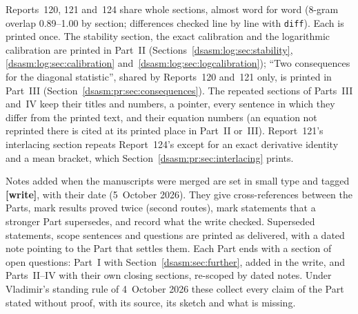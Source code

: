 \documentclass[11pt,letterpaper]{article}
\theoremstyle{remark}\newtheorem{remark}[theorem]{Remark}
\begin{document}
Reports~120, 121 and~124 share whole sections, almost word for word (8-gram overlap 0.89--1.00 by section; differences checked line by line with \texttt{diff}). Each is printed once. The stability section, the exact calibration and the logarithmic calibration are printed in Part~II (Sections~\ref{dsasm:log:sec:stability}, \ref{dsasm:log:sec:calibration} and~\ref{dsasm:log:sec:logcalibration}); ``Two consequences for the diagonal statistic'', shared by Reports~120 and~121 only, is printed in Part~III (Section~\ref{dsasm:pr:sec:consequences}). The repeated sections of Parts~III and~IV keep their titles and numbers, a pointer, every sentence in which they differ from the printed text, and their equation numbers (an equation not reprinted there is cited at its printed place in Part~II or~III). Report~121's interlacing section repeats Report~124's except for an exact derivative identity and a mean bracket, which Section~\ref{dsasm:pr:sec:interlacing} prints.

Notes added when the manuscripts were merged are set in small type and tagged \textbf{[write]}, with their date (5~October 2026). They give cross-references between the Parts, mark results proved twice (second routes), mark statements that a stronger Part supersedes, and record what the write checked. Superseded statements, scope sentences and questions are printed as delivered, with a dated note pointing to the Part that settles them. Each Part ends with a section of open questions: Part~I with Section~\ref{dsasm:sec:further}, added in the write, and Parts~II--IV with their own closing sections, re-scoped by dated notes. Under Vladimir's standing rule of 4~October 2026 these collect every claim of the Part stated without proof, with its source, its sketch and what is missing.
\end{document}
